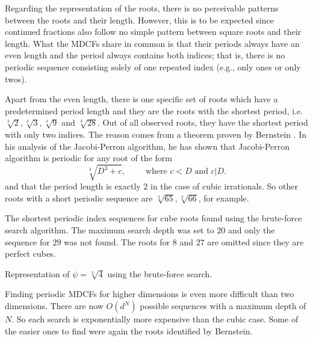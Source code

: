 Regarding the representation of the roots,
there is no perceivable patterns between the roots and their length.
However, this is to be expected since continued fractions also follow no simple
pattern between square roots and their length.
What the MDCFs share in common is that their periods always have an even length
and the period always contains both indices;
that is, there is no periodic sequence consisting solely of one repeated index
(e.g., only ones or only twos).

Apart from the even length, there is one specific set of roots which have a
predetermined period length
and they are the roots with the shortest period, i.e. $\sqrt[3]{2},
\sqrt[3]{3}, \sqrt[3]{9}$ and $\sqrt[3]{28}$.
Out of all observed roots, they have the shortest period with only two indices.
The reason comes from a theorem proven by Bernstein \cite{Bernstein71}.
In his analysis of the Jacobi-Perron algorithm,
he has shown that Jacobi-Perron algorithm is periodic for any root of the form
\[
  \sqrt[3]{D^3 + c}, \qquad \text{ where } c < D \text{ and } c|D.
\]
and that the period length is exactly $2$ in the case of cubic irrationals.
So other roots with a short periodic sequence are $\sqrt[3]{65}, \sqrt[3]{66}$,
for example.

\begin{table}[tbp]
  \caption{
    The shortest periodic index sequences for cube roots found using the
    brute-force search algorithm. The maximum search depth was set to $20$ and
    only the sequence for $29$ was not found. The roots for $8$ and $27$ are
    omitted since they are perfect cubes.}
  \label{tbl:cubics}
  \centering
  
\end{table}

\begin{table}[tbp]
  \caption{Representation of $ψ = \sqrt[3]{4}$ using the brute-force search.}
  \label{table:cube-root-4}
  \centering
  \footnotesize
  
\end{table}

Finding periodic MDCFs for higher dimensions is even more difficult than two dimensions.
There are now $O(d^N)$ possible sequences with a maximum depth of $N$.
So each search is exponentially more expensive than the cubic case.
Some of the easier ones to find were again the roots identified by Bernstein.

